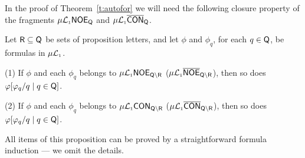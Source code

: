 In the proof of Theorem~\ref{t:autofor} we will need the following closure 
property of the fragments $\mu\mathcal{L}_{\scriptscriptstyle 1}\mathsf{NOE}_{\mathsf{Q}}$ and 
$\mu\mathcal{L}_{\scriptscriptstyle 1}\overline{\mathsf{CON}}_{\mathsf{Q}}$.

\begin{proposition}
\label{p:comp}
Let $\mathsf{R} \subseteq \mathsf{Q}$ be sets of proposition letters, and let $\phi$ 
and $\phi_{q}$, for each $q \in \mathsf{Q}$, be formulas in $\mu\mathcal{L}_{\scriptscriptstyle 1}$.

(1) If $\phi$ and each $\phi_{q}$ belongs to 
    $\mu\mathcal{L}_{\scriptscriptstyle 1}\mathsf{NOE}_{\mathsf{Q}\setminus\mathsf{R}}$ 
    ($\mu\mathcal{L}_{\scriptscriptstyle 1}\overline{\mathsf{NOE}}_{\mathsf{Q}\setminus\mathsf{R}}$), 
   then so does $\varphi[\varphi_{q}/q \mid q \in \mathsf{Q}]$.

(2) If $\phi$ and each $\phi_{q}$ belongs to
   $\mu\mathcal{L}_{\scriptscriptstyle 1}\mathsf{CON}_{\mathsf{Q}\setminus\mathsf{R}}$
   ($\mu\mathcal{L}_{\scriptscriptstyle 1}\overline{\mathsf{CON}}_{\mathsf{Q}\setminus\mathsf{R}}$), 
   then so does $\varphi[\varphi_{q}/q \mid q \in \mathsf{Q}]$.
\end{proposition}

All items of this proposition can be proved by a straightforward formula 
induction --- we omit the details.


